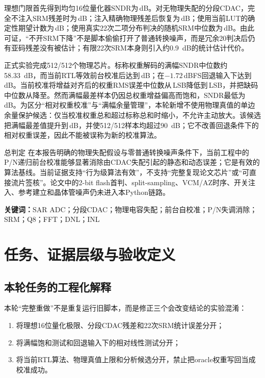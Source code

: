 \documentclass[11pt,a4paper,UTF8,fontset=none,openany]{ctexrep}
\numberwithin{equation}{chapter}
\numberwithin{figure}{chapter}
\numberwithin{table}{chapter}
\begin{document}
理想门限首先得到均匀16位量化器SNDR为\IdealDirectSndr\,dB。对无物理失配的分段CDAC，完全不注入SRM残差时为\IdealNoSrmSndr\,dB；注入精确物理残差后恢复为\IdealExactResidueSndr\,dB；使用当前LUT的确定性期望计数为\IdealExpectedSrmSndr\,dB；使用真实22次二项分布判决的随机SRM中位数为\IdealStochasticSrmSndr\,dB。由此可证，“不开SRM下降”不是脚本偷偷打开了普通转换噪声，而是冗余20判决后仍有亚码残差没有被估计；有限22次SRM本身则引入约\SI{0.9}{dB}的统计估计代价。

正式实验完成512/512个物理芯片。标称权重解码的满幅SNDR中位数约\SI{58.33}{dB}，而当前RTL等效前台校准后达到\CurrentFullMedian\,dB；在$-1.72$\,dBFS回退输入下达到\CurrentBackoffMedian\,dB。当前校准将增益对齐后的权重RMS误差中位数从\NominalWeightRmseMedian\,LSB降低到\CurrentWeightRmseMedian\,LSB，并把缺码中位数从\NominalMissingMedian 降至\CurrentMissingMedian。然而满幅最差样本仍因总权重增益偏高而饱和，SNDR最低为\CurrentFullMinimum\,dB。为区分“相对权重校准”与“满幅余量管理”，本轮新增不使用物理真值的单边余量保护候选：仅当校准权重总和超过标称总和时缩小，不允许主动放大。该候选把满幅最差值提升到\GuardFullMinimum\,dB，并使512/512样本均超过\SI{90}{dB}；它不改善回退条件下的相对权重误差，因此不能被误称为新的校准算法。

\begin{evidencebox}{总判定}
在本报告明确的物理失配假设与零普通转换噪声条件下，当前工程中的P/N递归前台校准能够显著消除由CDAC失配引起的静态和动态误差；它是有效的算法基线。当前证据支持“行为级算法有效”，不支持“完整复现论文芯片”或“可直接流片签核”。论文中的2-bit flash首判、split-sampling、VCM/AZ时序、开关注入、参考建立和晶体管噪声仍未进入本Python链路。
\end{evidencebox}

\noindent\textbf{关键词：}SAR ADC；分段CDAC；物理电容失配；前台自校准；P/N失调消除；SRM；Q8；FFT；DNL；INL

\clearpage
\tableofcontents
\clearpage
{}

\chapter{任务、证据层级与验收定义}

\section{本轮任务的工程化解释}

本轮“完整重做”不是重复运行旧脚本，而是修正三个会改变结论的实验混淆：
\begin{enumerate}
  \item 将理想16位量化极限、分段CDAC残差和22次SRM统计误差分开；
  \item 将满幅饱和测试和回退输入下的相对线性测试分开；
  \item 将当前RTL算法、物理真值上限和分析候选分开，禁止把oracle权重写回当成校准成功。
\end{enumerate}
\end{document}

